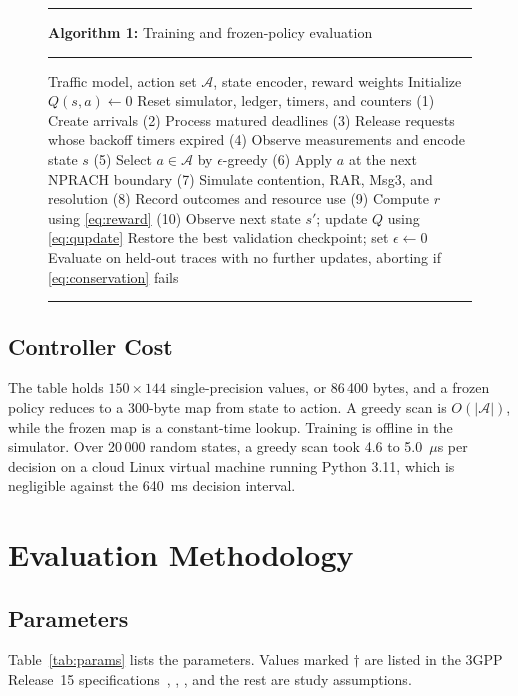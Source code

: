 \documentclass[conference]{IEEEtran}
\begin{document}
\begin{figure}[!t]
\footnotesize
\hrule\smallskip
\textbf{Algorithm 1:} Training and frozen-policy evaluation
\smallskip\hrule\smallskip
\begin{algorithmic}[0]
\REQUIRE Traffic model, action set $\mathcal{A}$, state encoder, reward weights
\STATE Initialize $Q(s,a) \leftarrow 0$
  \STATE Reset simulator, ledger, timers, and counters
    \STATE (1) Create arrivals
    \STATE (2) Process matured deadlines
    \STATE (3) Release requests whose backoff timers expired
    \STATE (4) Observe measurements and encode state $s$
    \STATE (5) Select $a \in \mathcal{A}$ by $\epsilon$-greedy
    \STATE (6) Apply $a$ at the next NPRACH boundary
    \STATE (7) Simulate contention, RAR, Msg3, and resolution
    \STATE (8) Record outcomes and resource use
    \STATE (9) Compute $r$ using \eqref{eq:reward}
    \STATE (10) Observe next state $s'$; update $Q$ using \eqref{eq:qupdate}
  \ENDWHILE
\ENDFOR
\STATE Restore the best validation checkpoint; set $\epsilon \leftarrow 0$
\STATE Evaluate on held-out traces with no further updates, aborting if
\eqref{eq:conservation} fails
\end{algorithmic}
\smallskip\hrule
\end{figure}

\subsection{Controller Cost}
The table holds $150 \times 144$ single-precision values, or 86\,400 bytes, and a
frozen policy reduces to a 300-byte map from state to action. A greedy scan is
$O(|\mathcal{A}|)$, while the frozen map is a constant-time lookup. Training is
offline in the simulator. Over 20\,000 random states, a greedy scan took 4.6 to
5.0~$\mu$s per decision on a cloud Linux virtual machine running Python 3.11, which is
negligible against the 640~ms decision interval.

\section{Evaluation Methodology}
\label{sec:evaluation}
\subsection{Parameters}
Table~\ref{tab:params} lists the parameters. Values marked $\dagger$ are listed in
the 3GPP Release~15 specifications~\cite{ts36331}, \cite{ts36321}, \cite{ts36211},
and the rest are study assumptions.
\end{document}
